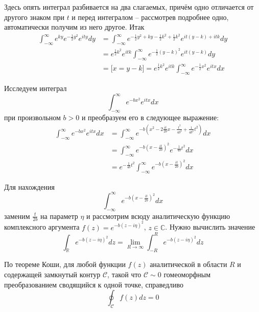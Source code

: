 \documentclass[a4paper]{article}
\newcommand{\Real}{\mathbb{R}}
\newcommand{\Cplx}{\mathbb{C}}
\newcommand{\Ccal}{\mathcal{C}}
\begin{document}
Здесь опять интеграл разбивается на два слагаемых, причём одно отличается
от другого знаком при $t$ и перед интегралом -- рассмотрев подробнее одно,
автоматически получим из него другое. Итак
\begin{align*}
	\int_{-\infty}^\infty e^{ky} e^{-\frac{1}{2}y^2} e^{it y} dy
	&= \int_{-\infty}^\infty e^{-\frac{1}{2}y^2 + ky - \frac{1}{2}k^2 + \frac{1}{2}k^2 } e^{it (y-k) + it k} dy\\
	&= e^{\frac{1}{2}k^2} e^{it k} \int_{-\infty}^\infty e^{-\frac{1}{2}(y-k)^2} e^{it (y-k)} dy\\
	&= \bigl[ x = y-k \bigr] = e^{\frac{1}{2}k^2} e^{it k} \int_{-\infty}^\infty e^{-\frac{1}{2}x^2} e^{it x} dx
\end{align*}

Исследуем интеграл
\[\int_{-\infty}^\infty e^{-b x^2} e^{it x} dx\]
при произвольном $b>0$ и преобразуем его в следующее выражение:
\begin{align*}
	\int_{-\infty}^\infty e^{-b x^2} e^{it x} dx
	&= \int_{-\infty}^\infty e^{-b (x^2 - 2\frac{it}{2b} x - \frac{t^2}{4b^2} + \frac{1}{4b^2}t^2 )} dx\\
	&= \int_{-\infty}^\infty e^{-b (x - \frac{it}{2b})^2} e^{-\frac{1}{4b}t^2} dx\\
	&= e^{-\frac{1}{4b}t^2} \int_{-\infty}^\infty e^{-b (x - \frac{it}{2b})^2} dx
\end{align*}

Для нахождения
\[\int_{-\infty}^\infty e^{-b (x - \frac{it}{2b})^2} dx\]
заменим $\frac{t}{2b}$ на параметр $\eta$ и рассмотрим всюду аналитическую функцию
комплексного аргумента $f(z) = e^{-b (z - i\eta)^2}$, $z\in \Cplx$. Нужно вычислить
значение 
\[\int_\Real e^{-b (z - i\eta)^2} dz
= \lim_{R\to\infty} \int_{-R}^R e^{-b (z - i\eta)^2} dz \]

По теореме Коши, для любой функции $f(z)$ аналитической в области $R$ и содержащей
замкнутый контур $\Ccal$, такой что $\Ccal\sim 0$ гомеоморфным преобразованием
сводящийся к одной точке, справедливо
\[\oint_\Ccal f(z) dz = 0\]
\end{document}
